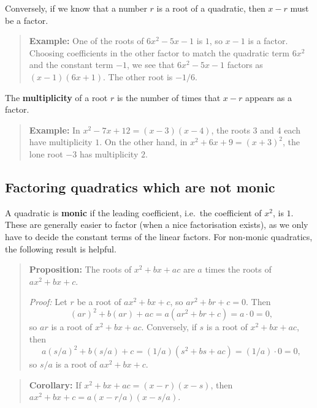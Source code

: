 \documentclass[
]{book}
\theoremstyle{definition}
\theoremstyle{definition}
\theoremstyle{definition}
\theoremstyle{definition}
\theoremstyle{remark}
\begin{document}
Conversely, if we know that a number \(r\) is a root of a quadratic, then \(x - r\) must be a factor.

\begin{quote}
\textbf{Example:} One of the roots of \(6x^2 - 5x - 1\) is \(1\), so \(x - 1\) is a factor. Choosing coefficients in the other factor to match the quadratic term \(6x^2\) and the constant term \(-1\), we see that \(6x^2 - 5x - 1\) factors as \((x - 1)(6x + 1)\). The other root is \(-1/6\).
\end{quote}

The \textbf{multiplicity} of a root \(r\) is the number of times that \(x - r\) appears as a factor.

\begin{quote}
\textbf{Example:} In \(x^2 - 7x + 12 = (x - 3)(x - 4)\), the roots \(3\) and \(4\) each have multiplicity \(1\). On the other hand, in \(x^2 + 6x + 9 = (x + 3)^2\), the lone root \(-3\) has multiplicity \(2\).
\end{quote}

\hypertarget{factoring-quadratics-which-are-not-monic}{%
\subsection{Factoring quadratics which are not monic}\label{factoring-quadratics-which-are-not-monic}}

A quadratic is \textbf{monic} if the leading coefficient, i.e.~the coefficient of \(x^2\), is \(1\). These are generally easier to factor (when a nice factorisation exists), as we only have to decide the constant terms of the linear factors. For non-monic quadratics, the following result is helpful.

\begin{quote}
\textbf{Proposition:} The roots of \(x^2 + bx + ac\) are \(a\) times the roots of \(ax^2 + bx + c\).

\emph{Proof:} Let \(r\) be a root of \(ax^2 + bx + c\), so \(ar^2 + br + c = 0\). Then
\[(ar)^2 + b(ar) + ac = a(ar^2 + br + c) = a\cdot 0 = 0,\]
so \(ar\) is a root of \(x^2 + bx + ac\). Conversely, if \(s\) is a root of \(x^2 + bx + ac\), then
\[a(s/a)^2 + b(s/a) + c = (1/a)(s^2 + bs + ac) = (1/a)\cdot 0 = 0,\]
so \(s/a\) is a root of \(ax^2 + bx + c\).
\end{quote}

\begin{quote}
\textbf{Corollary:} If \(x^2 + bx + ac = (x - r)(x - s)\), then \(ax^2 + bx + c = a(x - r/a)(x - s/a)\).
\end{quote}
\end{document}
